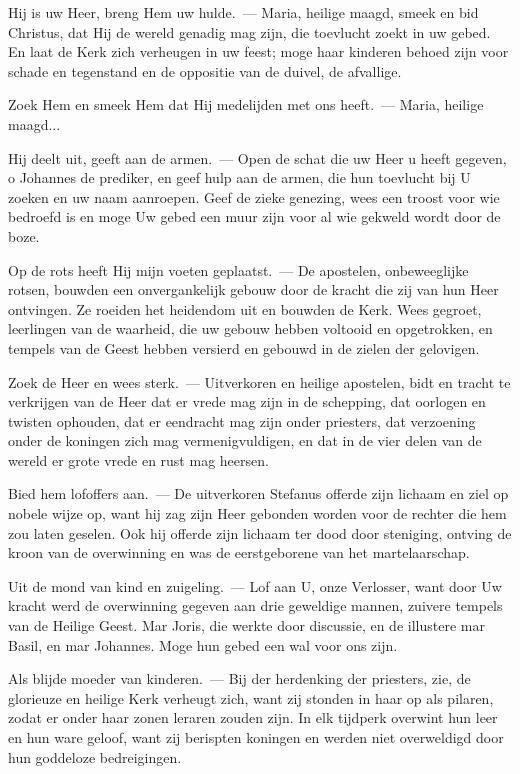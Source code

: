 \documentclass[12pt,twoside,a5paper]{article}
\begin{document}
\begin{halfparskip}

  Hij is uw Heer, breng Hem uw hulde.~--- Maria, heilige maagd, smeek en bid Christus, dat Hij de wereld genadig mag zijn, die toevlucht zoekt in uw gebed. En laat de Kerk zich verheugen in uw feest; moge haar kinderen behoed zijn voor schade en tegenstand en de oppositie van de duivel, de afvallige.


  Zoek Hem en smeek Hem dat Hij medelijden met ons heeft.~--- Maria, heilige maagd...

  Hij deelt uit, geeft aan de armen.~--- Open de schat die uw Heer u heeft gegeven, o Johannes de prediker, en geef hulp aan de armen, die hun toevlucht bij U zoeken en uw naam aanroepen. Geef de zieke genezing, wees een troost voor wie bedroefd is en moge Uw gebed een muur zijn voor al wie gekweld wordt door de boze.

  Op de rots heeft Hij mijn voeten geplaatst.~--- De apostelen, onbeweeglijke rotsen, bouwden een onvergankelijk gebouw door de kracht die zij van hun Heer ontvingen. Ze roeiden het heidendom uit en bouwden de Kerk. Wees gegroet, leerlingen van de waarheid, die uw gebouw hebben voltooid en opgetrokken, en tempels van de Geest hebben versierd en gebouwd in de zielen der gelovigen.

  Zoek de Heer en wees sterk.~--- Uitverkoren en heilige apostelen, bidt en tracht te verkrijgen van de Heer dat er vrede mag zijn in de schepping, dat oorlogen en twisten ophouden, dat er eendracht mag zijn onder priesters, dat verzoening onder de koningen zich mag vermenigvuldigen, en dat in de vier delen van de wereld er grote vrede en rust mag heersen.

  Bied hem lofoffers aan.~--- De uitverkoren Stefanus offerde zijn lichaam en ziel op nobele wijze op, want hij zag zijn Heer gebonden worden voor de rechter die hem zou laten geselen. Ook hij offerde zijn lichaam ter dood door steniging, ontving de kroon van de overwinning en was de eerstgeborene van het martelaarschap.

  Uit de mond van kind en zuigeling.~--- Lof aan U, onze Verlosser, want door Uw kracht werd de overwinning gegeven aan drie geweldige mannen, zuivere tempels van de Heilige Geest. Mar Joris, die werkte door discussie, en de illustere mar Basil, en mar Johannes. Moge hun gebed een wal voor ons zijn.

  Als blijde moeder van kinderen.~--- Bij der herdenking der priesters, zie, de glorieuze en heilige Kerk verheugt zich, want zij stonden in haar op als pilaren, zodat er onder haar zonen leraren zouden zijn. In elk tijdperk overwint hun leer en hun ware geloof, want zij berispten koningen en werden niet overweldigd door hun goddeloze bedreigingen.


\end{halfparskip}
\end{document}
